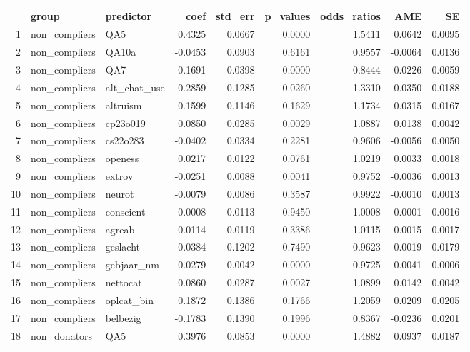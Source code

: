 \begin{table}[ht]
\centering
\begin{tabular}{rllrrrrrr}
  \hline
 & group & predictor & coef & std\_err & p\_values & odds\_ratios & AME & SE \\ 
  \hline
1 & non\_compliers & QA5 & 0.4325 & 0.0667 & 0.0000 & 1.5411 & 0.0642 & 0.0095 \\ 
  2 & non\_compliers & QA10a & -0.0453 & 0.0903 & 0.6161 & 0.9557 & -0.0064 & 0.0136 \\ 
  3 & non\_compliers & QA7 & -0.1691 & 0.0398 & 0.0000 & 0.8444 & -0.0226 & 0.0059 \\ 
  4 & non\_compliers & alt\_chat\_use & 0.2859 & 0.1285 & 0.0260 & 1.3310 & 0.0350 & 0.0188 \\ 
  5 & non\_compliers & altruism & 0.1599 & 0.1146 & 0.1629 & 1.1734 & 0.0315 & 0.0167 \\ 
  6 & non\_compliers & cp23o019 & 0.0850 & 0.0285 & 0.0029 & 1.0887 & 0.0138 & 0.0042 \\ 
  7 & non\_compliers & cs22o283 & -0.0402 & 0.0334 & 0.2281 & 0.9606 & -0.0056 & 0.0050 \\ 
  8 & non\_compliers & openess & 0.0217 & 0.0122 & 0.0761 & 1.0219 & 0.0033 & 0.0018 \\ 
  9 & non\_compliers & extrov & -0.0251 & 0.0088 & 0.0041 & 0.9752 & -0.0036 & 0.0013 \\ 
  10 & non\_compliers & neurot & -0.0079 & 0.0086 & 0.3587 & 0.9922 & -0.0010 & 0.0013 \\ 
  11 & non\_compliers & conscient & 0.0008 & 0.0113 & 0.9450 & 1.0008 & 0.0001 & 0.0016 \\ 
  12 & non\_compliers & agreab & 0.0114 & 0.0119 & 0.3386 & 1.0115 & 0.0015 & 0.0017 \\ 
  13 & non\_compliers & geslacht & -0.0384 & 0.1202 & 0.7490 & 0.9623 & 0.0019 & 0.0179 \\ 
  14 & non\_compliers & gebjaar\_nm & -0.0279 & 0.0042 & 0.0000 & 0.9725 & -0.0041 & 0.0006 \\ 
  15 & non\_compliers & nettocat & 0.0860 & 0.0287 & 0.0027 & 1.0899 & 0.0142 & 0.0042 \\ 
  16 & non\_compliers & oplcat\_bin & 0.1872 & 0.1386 & 0.1766 & 1.2059 & 0.0209 & 0.0205 \\ 
  17 & non\_compliers & belbezig & -0.1783 & 0.1390 & 0.1996 & 0.8367 & -0.0236 & 0.0201 \\ 
  18 & non\_donators & QA5 & 0.3976 & 0.0853 & 0.0000 & 1.4882 & 0.0937 & 0.0187 \\ 

\end{tabular}
\end{table}
